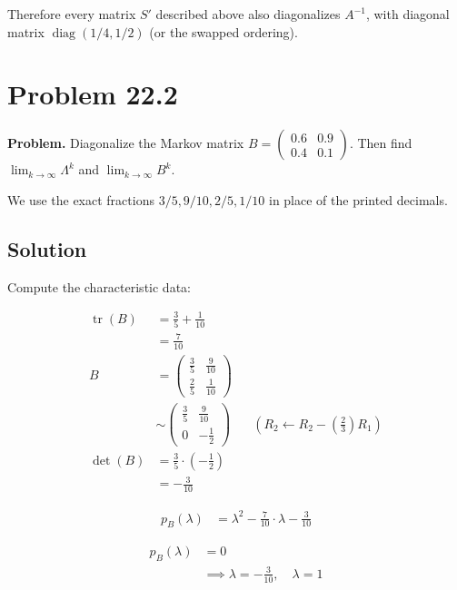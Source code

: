 \documentclass[11pt]{article}
\begin{document}
Therefore every matrix \(S'\) described above also diagonalizes \(A^{-1}\), with diagonal matrix \(\operatorname{diag}(1/4,1/2)\) (or the swapped ordering).

\newpage
\section*{Problem 22.2}
\textbf{Problem.} Diagonalize the Markov matrix \(B=\begin{pmatrix}0.6&0.9\\0.4&0.1\end{pmatrix}\). Then find \(\lim_{k\to\infty}\Lambda^k\) and \(\lim_{k\to\infty}B^k\).

We use the exact fractions \(3/5,9/10,2/5,1/10\) in place of the printed decimals.

\subsection*{Solution}
Compute the characteristic data:

\begin{align*}\operatorname{tr}\left(B\right) &= \frac{3}{5} + \frac{1}{10} \\ &= \frac{7}{10} \\
B &= \begin{pmatrix}\frac{3}{5} & \frac{9}{10} \\ \frac{2}{5} & \frac{1}{10}\end{pmatrix} \\
&\sim \begin{pmatrix}\frac{3}{5} & \frac{9}{10} \\ 0 & -\frac{1}{2}\end{pmatrix} && \left(R_{2}\leftarrow R_{2}-\left(\frac{2}{3}\right)R_{1}\right) \\
\det\left(B\right) &= \frac{3}{5}\cdot \left(-\frac{1}{2}\right) \\
&= -\frac{3}{10}\end{align*}

\[\begin{aligned}p_{B}\left(\lambda\right) &= \lambda^{2} - \frac{7}{10} \cdot \lambda - \frac{3}{10}\end{aligned}\]

\[\begin{aligned}p_{B}\left(\lambda\right) &= 0 \\ &\implies \lambda = -\frac{3}{10},\quad \lambda = 1\end{aligned}\]
\end{document}
